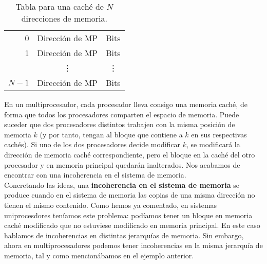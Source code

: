 \begin{table}
\centering
\begin{tabular}{r|c|c|}
    \cline{2-3}
    0 & Dirección de MP & Bits \\ \cline{2-3}
    1 & Dirección de MP & Bits \\ \cline{2-3}
      & \vdots & \vdots \\ \cline{2-3}
    $N-1$ & Dirección de MP & Bits \\ \cline{2-3}
\end{tabular}
\caption{Tabla para una caché de $N$ direcciones de memoria.}
\label{tab:tabla_cache}
\end{table}

En un multiprocesador, cada procesador lleva consigo una memoria caché, de forma que todos los procesadores comparten el espacio de memoria. Puede suceder que dos procesadores distintos trabajen con la misma posición de memoria $k$ (y por tanto, tengan al bloque que contiene a $k$ en sus respectivas cachés). Si uno de los dos procesadores decide modificar $k$, se modificará la dirección de memoria caché correspondiente, pero el bloque en la caché del otro procesador y en memoria principal quedarán inalterados. Nos acabamos de encontrar con una incoherencia en el sistema de memoria.\\

Concretando las ideas, una \textbf{incoherencia en el sistema de memoria} se produce cuando en el sistema de memoria las copias de una misma dirección no tienen el mismo contenido. Como hemos ya comentado, en sistemas uniprocesdores teníamos este problema: podíamos tener un bloque en memoria caché modificado que no estuviese modificado en memoria principal. En este caso hablamos de incoherencias en distintas jerarquías de memoria. Sin embargo, ahora en multiprocesadores podemos tener incoherencias en la misma jerarquía de memoria, tal y como mencionábamos en el ejemplo anterior.


